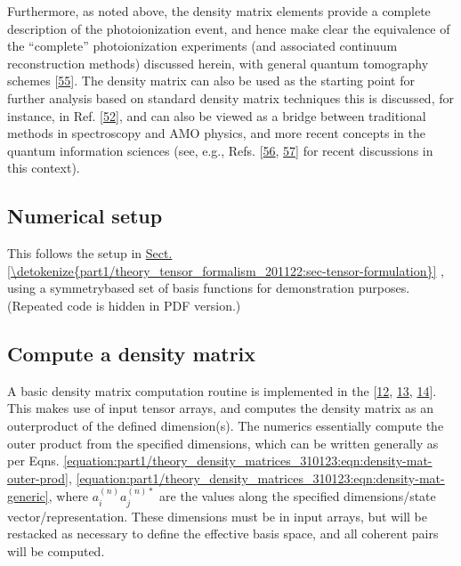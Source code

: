 \documentclass[letterpaper,table,10pt,english]{jupyterBook}
\begin{document}
\sphinxAtStartPar
Furthermore, as noted above, the density matrix elements provide a complete description of the photoionization event, and hence make clear the equivalence of the “complete” photoionization experiments (and associated continuum reconstruction methods) discussed herein, with general quantum tomography schemes {[}\hyperlink{cite.backmatter/bibliography:id654}{55}{]}. The density matrix can also be used as the starting point for further analysis based on standard density matrix techniques \sphinxhyphen{} this is discussed, for instance, in Ref. {[}\hyperlink{cite.backmatter/bibliography:id444}{52}{]}, and can also be viewed as a bridge between traditional methods in spectroscopy and AMO physics, and more recent concepts in the quantum information sciences (see, e.g., Refs. {[}\hyperlink{cite.backmatter/bibliography:id770}{56}, \hyperlink{cite.backmatter/bibliography:id820}{57}{]} for recent discussions in this context).


\subsection{Numerical setup}
\label{\detokenize{part1/theory_density_matrices_310123:numerical-setup}}
\sphinxAtStartPar
This follows the setup in \hyperref[\detokenize{part1/theory_tensor_formalism_201122:sec-tensor-formulation}]{Sect.\@ \ref{\detokenize{part1/theory_tensor_formalism_201122:sec-tensor-formulation}}} {\hyperref[\detokenize{part1/theory_tensor_formalism_201122:sec-tensor-formulation}]{}}, using a symmetry\sphinxhyphen{}based set of basis functions for demonstration purposes. (Repeated code is hidden in PDF version.)


\subsection{Compute a density matrix}
\label{\detokenize{part1/theory_density_matrices_310123:compute-a-density-matrix}}
\sphinxAtStartPar
A basic density matrix computation routine is implemented in the  {[}\hyperlink{cite.backmatter/bibliography:id561}{12}, \hyperlink{cite.backmatter/bibliography:id508}{13}, \hyperlink{cite.backmatter/bibliography:id506}{14}{]}. This makes use of input tensor arrays, and computes the density matrix as an outer\sphinxhyphen{}product of the defined dimension(s). The numerics essentially compute the outer product from the specified dimensions, which can be written generally as per Eqns. \eqref{equation:part1/theory_density_matrices_310123:eqn:density-mat-outer-prod}, \eqref{equation:part1/theory_density_matrices_310123:eqn:density-mat-generic}, where \(a_{i}^{(n)}a_{j}^{(n)*}\) are the values along the specified dimensions/state vector/representation. These dimensions must be in input arrays, but will be restacked as necessary to define the effective basis space, and all coherent pairs will be computed.
\end{document}
